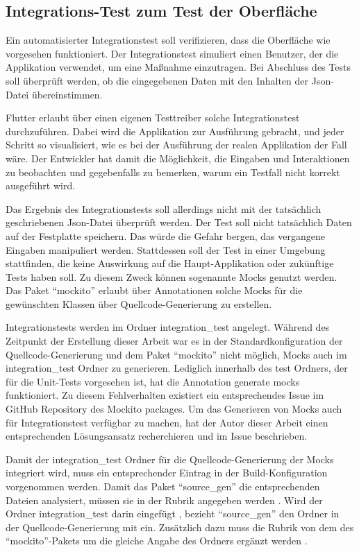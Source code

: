 \clearpage


\subsection{Integrations-Test zum Test der Oberfläche}


Ein automatisierter Integrationstest soll verifizieren, dass die Oberfläche wie vorgesehen funktioniert. Der Integrationstest simuliert einen Benutzer, der die Applikation verwendet, um eine Maßnahme einzutragen. Bei Abschluss des Tests soll überprüft werden, ob die  eingegebenen Daten mit den Inhalten der Json-Datei übereinstimmen.

Flutter erlaubt über einen eigenen Testtreiber solche Integrationstest durchzuführen. Dabei wird die Applikation zur Ausführung gebracht, und jeder Schritt so visualisiert, wie es bei der Ausführung der realen Applikation der Fall wäre. Der Entwickler hat damit die Möglichkeit, die Eingaben und Interaktionen zu beobachten und gegebenfalls zu bemerken, warum ein Testfall nicht korrekt ausgeführt wird.

Das Ergebnis des Integrationstests soll allerdings nicht mit der tatsächlich geschriebenen Json-Datei überprüft werden. Der Test soll nicht tatsächlich Daten auf der Festplatte speichern. Das würde die Gefahr bergen, das  vergangene Eingaben manipuliert werden. Stattdessen soll der Test in einer Umgebung stattfinden, die keine Auswirkung auf die Haupt-Applikation oder zukünftige Tests haben soll. Zu diesem Zweck können sogenannte Mocks genutzt werden. Das Paket \enquote{mockito} erlaubt über Annotationen solche Mocks für die gewünschten Klassen  über Quellcode-Generierung zu erstellen.

Integrationstests werden im Ordner integration_test angelegt. Während des Zeitpunkt der Erstellung dieser Arbeit war es in der Standardkonfiguration der Quellcode-Generierung und dem Paket \enquote{mockito} nicht möglich, Mocks auch im integration_test Ordner zu generieren.  Lediglich innerhalb des test Ordners, der für die Unit-Tests vorgesehen ist, hat die Annotation generate mocks funktioniert. Zu diesem Fehlverhalten existiert ein entsprechendes Issue im GitHub Repository  des Mockito packages.  Um das Generieren von Mocks auch für Integrationstest verfügbar zu machen, hat der Autor dieser Arbeit einen entsprechenden Lösungsansatz recherchieren und im Issue beschrieben.  

Damit der integration_test Ordner für die Quellcode-Generierung der Mocks integriert wird, muss ein entsprechender Eintrag in der Build-Konfiguration vorgenommen werden. Damit das Paket \enquote{source_gen} die entsprechenden Dateien analysiert, müssen sie in der Rubrik  angegeben werden . Wird der Ordner integration_test darin eingefügt , bezieht \enquote{source_gen} den Ordner in der Quellcode-Generierung mit ein. Zusätzlich dazu muss die Rubrik  von dem  des \enquote{mockito}-Pakets  um die gleiche Angabe des Ordners ergänzt werden .

